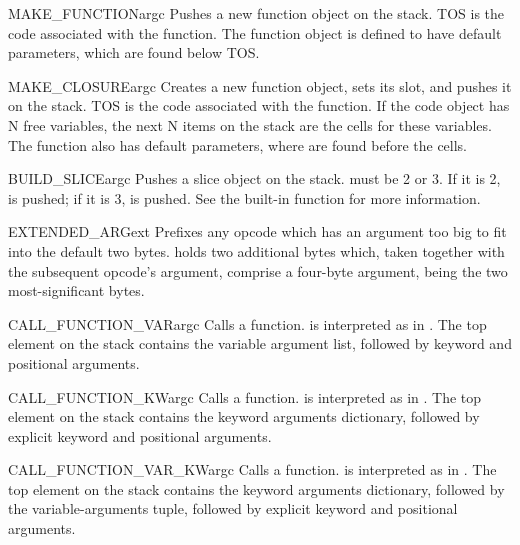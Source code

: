 \begin{opcodedesc}{MAKE_FUNCTION}{argc}
Pushes a new function object on the stack.  TOS is the code associated
with the function.  The function object is defined to have 
default parameters, which are found below TOS.
\end{opcodedesc}

\begin{opcodedesc}{MAKE_CLOSURE}{argc}
Creates a new function object, sets its  slot, and
pushes it on the stack.  TOS is the code associated with the function.
If the code object has N free variables, the next N items on the stack
are the cells for these variables.  The function also has 
default parameters, where are found before the cells.
\end{opcodedesc}

\begin{opcodedesc}{BUILD_SLICE}{argc}
Pushes a slice object on the stack.   must be 2 or 3.  If it
is 2,  is pushed; if it is 3,
 is pushed.
See the  built-in function for more
information.
\end{opcodedesc}

\begin{opcodedesc}{EXTENDED_ARG}{ext}
Prefixes any opcode which has an argument too big to fit into the
default two bytes.   holds two additional bytes which, taken
together with the subsequent opcode's argument, comprise a four-byte
argument,  being the two most-significant bytes.
\end{opcodedesc}

\begin{opcodedesc}{CALL_FUNCTION_VAR}{argc}
Calls a function.  is interpreted as in .
The top element on the stack contains the variable argument list, followed
by keyword and positional arguments.
\end{opcodedesc}

\begin{opcodedesc}{CALL_FUNCTION_KW}{argc}
Calls a function.  is interpreted as in .
The top element on the stack contains the keyword arguments dictionary, 
followed by explicit keyword and positional arguments.
\end{opcodedesc}

\begin{opcodedesc}{CALL_FUNCTION_VAR_KW}{argc}
Calls a function.  is interpreted as in
.  The top element on the stack contains the
keyword arguments dictionary, followed by the variable-arguments
tuple, followed by explicit keyword and positional arguments.
\end{opcodedesc}
